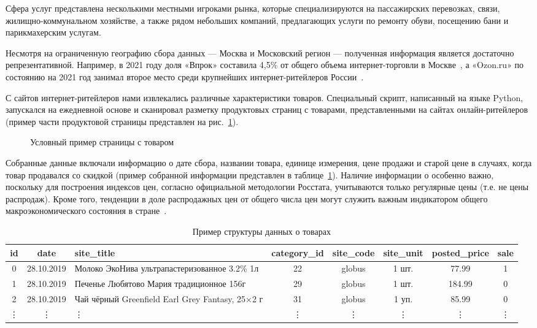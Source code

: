 Сфера услуг представлена несколькими местными игроками рынка, которые специализируются на пассажирских перевозках, связи, жилищно-коммунальном хозяйстве, а также рядом небольших компаний, предлагающих услуги по ремонту обуви, посещению бани и парикмахерским услугам.

Несмотря на ограниченную географию сбора данных — Москва и Московский регион — полученная информация является достаточно репрезентативной. Например, в 2021 году доля «Впрок» составила 4,5\% от общего объема интернет-торговли в Москве~\cite{X5DigitalSales2021}, а «Ozon.ru» по состоянию на 2021 год занимал второе место среди крупнейших интернет-ритейлеров России~\cite{Top100Ecommerce2021}.

С сайтов интернет-ритейлеров нами извлекались различные характеристики товаров. Специальный скрипт, написанный на языке Python, запускался на ежедневной основе и сканировал разметку продуктовых страниц с товарами, представленными на сайтах онлайн-ритейлеров (пример части продуктовой страницы представлен на рис.~\cref{fig:example_product}).

\begin{figure}[ht]
	\caption{Условный пример страницы с товаром}\label{fig:example_product}
\end{figure}


Собранные данные включали информацию о дате сбора, названии товара, единице измерения, цене продажи и старой цене в случаях, когда товар продавался со скидкой (пример собранной информации представлен в таблице~\ref{tab:product_data}). Наличие информации о  особенно важно, поскольку для построения индексов цен, согласно официальной методологии Росстата, учитываются только регулярные цены (т.е. не цены распродаж). Кроме того, тенденции в доле распродажных цен от общего числа цен могут служить важным индикатором общего макроэкономического состояния в стране~\cite{Nakamura2008}. 

\begin{table}[h!]
	\centering
	\caption{Пример структуры данных о товарах}
	\label{tab:product_data}
	\scriptsize
	\begin{tabular}{|c|c|p{4cm}|c|c|c|c|c|}
		\hline
		\textbf{id} & \textbf{date} & \textbf{site\_title} & \textbf{category\_id} & \textbf{site\_code} & \textbf{site\_unit} & \textbf{posted\_price} & \textbf{sale} \\ \hline
		0 & 28.10.2019 & Молоко ЭкоНива ультрапастеризованное 3.2\% 1л & 22 & globus & 1 шт. & 77.99 & 1 \\ \hline
		1 & 28.10.2019 & Печенье Любятово Мария традиционное 156г & 29 & globus & 1 шт. & 184.99 & 0 \\ \hline
		2 & 28.10.2019 & Чай чёрный Greenfield Earl Grey Fantasy, 25×2 г & 31 & globus & 1 уп. & 85.99 & 0 \\ \hline
		\vdots & \vdots & \vdots & \vdots & \vdots & \vdots & \vdots & \vdots \\ \hline
	\end{tabular}
\end{table}


